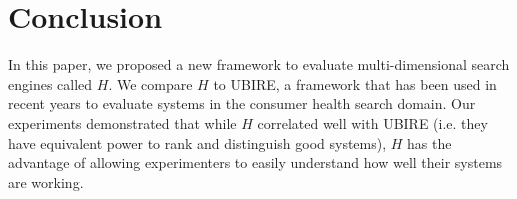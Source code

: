 
\section{Conclusion}
\label{sec:conclusion}

In this paper, we proposed a new framework to evaluate multi-dimensional search engines called $H$.
We compare $H$ to UBIRE, a framework that has been used in recent years to evaluate systems in the consumer health search domain.
Our experiments demonstrated that while $H$ correlated well with UBIRE (i.e. they have equivalent power to rank and distinguish good systems),
$H$ has the advantage of allowing experimenters to easily understand how well their systems are working.

